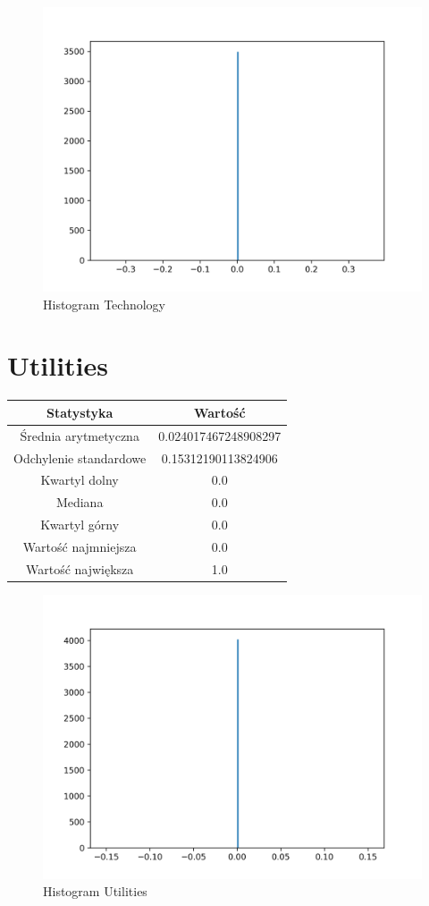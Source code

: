 \documentclass{article}
\begin{document}
\begin{figure}[h!]
    \includegraphics[width=\linewidth]{variables/Technology.png}
    \caption{Histogram Technology }
\end{figure}\section{ Utilities }

\begin{center}
    \begin{tabular}{|c | c|} 
    \hline
    Statystyka & Wartość \\
    \hline\hline
    Średnia arytmetyczna & 0.024017467248908297 \\ 
    \hline
    Odchylenie standardowe & 0.15312190113824906 \\
    \hline
    Kwartyl dolny & 0.0 \\
    \hline
    Mediana & 0.0 \\
    \hline
    Kwartyl górny & 0.0 \\
    \hline
    Wartość najmniejsza & 0.0 \\
    \hline
    Wartość największa & 1.0 \\
    \hline
   \end{tabular}
\end{center}

\begin{figure}[h!]
    \includegraphics[width=\linewidth]{variables/Utilities.png}
    \caption{Histogram Utilities }
\end{figure}
\end{document}
